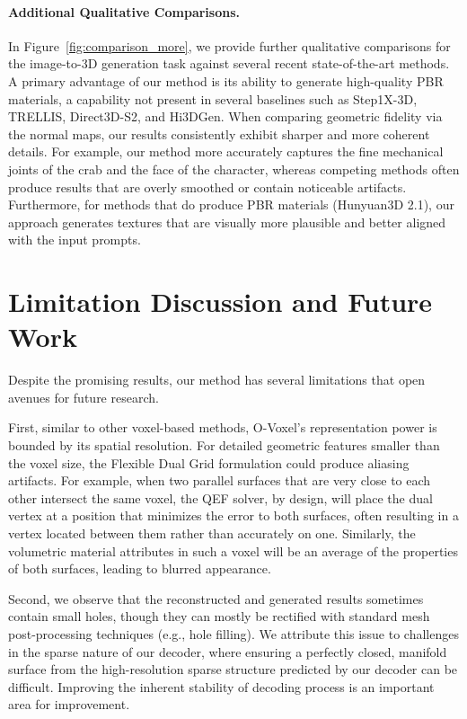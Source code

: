 \documentclass[10pt,twocolumn,letterpaper]{article}
\begin{document}
\paragraph{Additional Qualitative Comparisons.}
In Figure~\ref{fig:comparison_more}, we provide further qualitative comparisons for the image-to-3D generation task against several recent state-of-the-art methods. A primary advantage of our method is its ability to generate high-quality PBR materials, a capability not present in several baselines such as Step1X-3D, TRELLIS, Direct3D-S2, and Hi3DGen. When comparing geometric fidelity via the normal maps, our results consistently exhibit sharper and more coherent details. For example, our method more accurately captures the fine mechanical joints of the crab and the face of the character, whereas competing methods often produce results that are overly smoothed or contain noticeable artifacts. Furthermore, for methods that do produce PBR materials (Hunyuan3D 2.1), our approach generates textures that are visually more plausible and better aligned with the input prompts.


\section{Limitation Discussion and Future Work}

Despite the promising results, our method has several limitations that open avenues for future research.

First, similar to other voxel-based methods, O-Voxel's representation power is bounded by its spatial resolution. For detailed geometric features smaller than the voxel size, the Flexible Dual Grid formulation could produce aliasing artifacts.
For example, when two parallel surfaces that are very close to each other intersect the same voxel, the QEF solver, by design, will place the dual vertex at a position that minimizes the error to both surfaces, often resulting in a vertex located between them rather than accurately on one.
Similarly, the volumetric material attributes in such a voxel will be an average of the properties of both surfaces, leading to blurred appearance.

Second, we observe that the reconstructed and generated results sometimes contain small holes, though they can mostly be rectified with standard mesh post-processing techniques (e.g., hole filling). We attribute this issue to challenges in the sparse nature of our decoder, where ensuring a perfectly closed, manifold surface from the high-resolution sparse structure predicted by our decoder can be difficult. Improving the inherent stability of decoding process is an important area for improvement.
\end{document}
